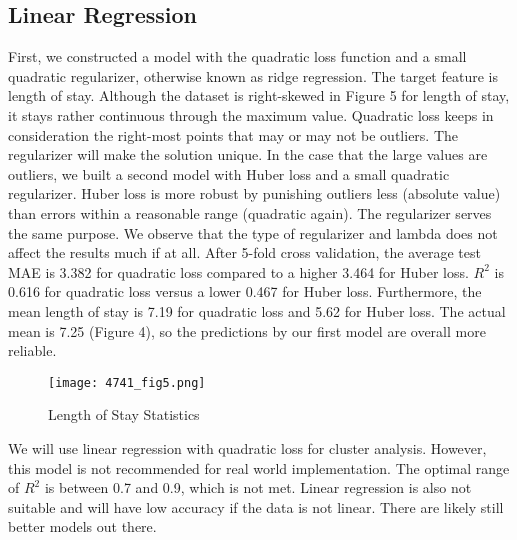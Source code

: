 \documentclass{article}
\begin{document}
\subsection{Linear Regression}
First, we constructed a model with the quadratic loss function and a small quadratic regularizer, otherwise known as ridge regression. The target feature is length of stay. Although the dataset is right-skewed in Figure 5 for length of stay, it stays rather continuous through the maximum value. Quadratic loss keeps in consideration the right-most points that may or may not be outliers. The regularizer will make the solution unique.
\newline
\newline
In the case that the large values are outliers, we built a second model with Huber loss and a small quadratic regularizer. Huber loss is more robust by punishing outliers less (absolute value) than errors within a reasonable range (quadratic again). The regularizer serves the same purpose. We observe that the type of regularizer and lambda does not affect the results much if at all.
\newline
\newline
After 5-fold cross validation, the average test MAE is 3.382 for quadratic loss compared to a higher 3.464 for Huber loss. $R^2$ is 0.616 for quadratic loss versus a lower 0.467 for Huber loss. Furthermore, the mean length of stay is 7.19 for quadratic loss and 5.62 for Huber loss. The actual mean is 7.25 (Figure 4), so the predictions by our first model are overall more reliable.
\newline\begin{figure}[H]
    \centering
    \texttt{[image: 4741\_fig5.png]}
    \caption{Length of Stay Statistics}
\end{figure}
\noindent
We will use linear regression with quadratic loss for cluster analysis. However, this model is not recommended for real world implementation. The optimal range of $R^2$ is between 0.7 and 0.9, which is not met. Linear regression is also not suitable and will have low accuracy if the data is not linear. There are likely still better models out there.
\newline
\end{document}
